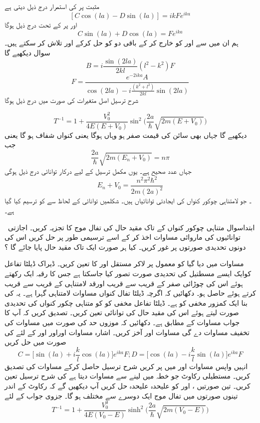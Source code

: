  مثبت پر کی استمرار درج ذیل دیتی ہے 
\[[C\cos(la)-D\sin(la)]=ikFe^{ika} \]
اور  پر کے تحت درج ذیل ہوگا\[C\sin(la)+D\cos(la)=Fe^{ika} \]
 ہم ان میں سے   اور  کو خارج کر کے باقی دو کو حل کرکے اور  تلاش کر سکتے ہیں۔  سوال دیکھیے گا
\[B=i\frac{\sin(2la)}{2kl}(l^{2}-k^{2})F \]
\[F=\frac{e^{-2ika}A}{\cos(2la)-i\frac{(k^{2}+l^{2})}{2kl}\sin(2la)} \]
  شرح ترسیل  اصل متغیرات کی صورت میں درج ذیل ہوگا

\[T^{-1}=1+\frac{V_{0}^{2}}{4E(E+V_{0})}\sin^{2}\big(\frac{2a}{\hbar}\sqrt{2m(E+V_{0})} \big)  \]
 دیکھیے گا جہاں بھی سائن کی قیمت صفر ہو وہاں ہوگا یعنی کنواں شفاف ہو گا یعنی جب\[\frac{2a}{\hbar}\sqrt{2m(E_{n}+V_{0})}=n\pi \] جہاں   عدد صحیح ہے۔ یوں مکمل ترسیل کے لیے درکار توانائی درج ذیل ہوگی\[E_{n}+V_{0}=\frac{n^{2}\pi^{2}\hbar^{2}}{2m(2a)^{2}} \]۔
 جو لامتناہی چوکور کنواں کی ایجادتی توانائیاں ہیں۔  شکلمیں توانائی کے لحاظ سے  کو ترسیم کیا گیا ہے۔




\ ابتدا{سوال} 
متناہی چوکور کنواں کے تاک مقید حال کی تفال  موج کا تجزیہ کریں۔ اجازتی  توانائیوں کی ماروائی مساوات اخذ کر کے اسے ترسیمی طور پر حل کریں اس کی دونوں تحدیدی صورتوں پر غور کریں۔ 
 کیا ہر صورت ایک تاک مقید حال پایا جائے گا ؟ 

 مساوات میں دیا گیا  کو معمول پر لاکر مستقل  اور کا تعین  کریں۔
ڈیراک ڈیلٹا تفاعل کوایک ایسے مسطتیل کی  تحدیدی صورت تصور کیا جاسکتا ہے جس کا  رقبہ ایک  رکھتے ہوئے اس کی چوڑائی صفر کے قریب سے قریب اورقد لامتناہی کے قریب سے قریب کرتے ہوئے حاصل ہو۔ 
دکھائیں کہ اگرچہ ڈیلٹا تفال کنواں مساوات لامتناہی گہرا ہے۔  یہ کی بنا ایک کمزور مخفی کو ہے۔ 
 ڈیلٹا تفاعل مخفی کو کو  متناہی چکور کنواں کی تحدیدی  صورت لیتے ہوئے اس کی مقید حال کی توانائی تعین کریں۔ تصدیق کریں کہ آپ کا جواب مساوات کے مطابق ہے۔ 
 دکھائیں کہ موزوں حد کی صورت میں مساوات کی تخفیف مساوات دے گی 
مساوات  اور  آخز کریں۔  اشارہ مساوات اوراور  اور   کے لئے  کی صورت میں حل کریں
\[C=\Big[\sin(la)+i\frac{k}{l}\cos(la)   \Big]e^{ika}F ; D=\Big[\cos(la)-i\frac{k}{l}\sin(la)  \Big]e^{ika}F \]
 انہیں واپس مساوات  اور  میں پر کریں شرح ترسیل حاصل کرکے مساوات کی تصدیق کریں۔
مستطیلی رکاوٹ جو خطہ  میں لینے سے مساوات  دیتا ہے کی شرح ترسیل  تعین کریں۔ 
تین صورتیں  ،
اور  کو علیحدہ علیحدہ حل کریں آپ دیکھیں گے کہ رکاوٹ کے اندر تینوں صورتوں میں تفال موج ایک دوسرے سے مختلف ہو گا۔ 
 جزوی جواب  کے لئے
\[T^{-1}=1+\frac{V_{0}^{0}}{4E(V_{0}-E)}\sinh^{2}\Big(\frac{2a}{\hbar}\sqrt{2m(V_{0}-E)}   \Big) \]

